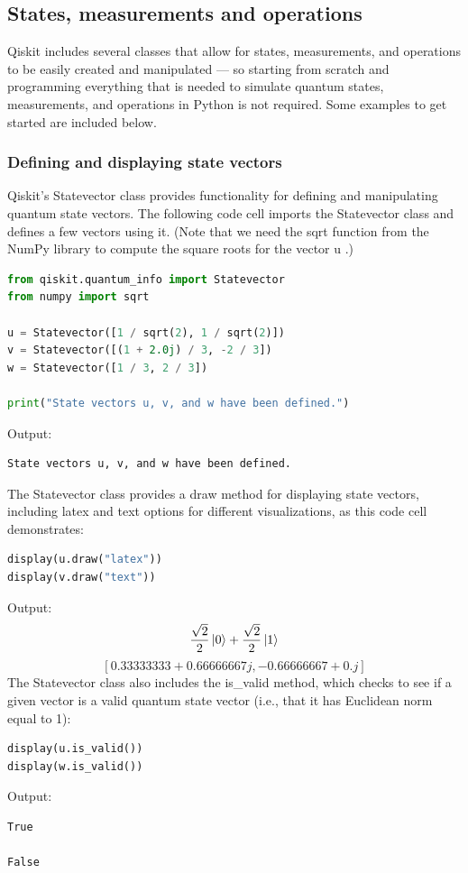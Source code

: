 \subsection{States, measurements and operations}
Qiskit includes several classes that allow for states, measurements, and operations to be easily created and manipulated — so starting from scratch and programming everything that is needed to simulate quantum states, measurements, and operations in Python is not required. Some examples to get started are included below.

\subsubsection{Defining and displaying state vectors}

Qiskit's  Statevector  class provides functionality for defining and manipulating quantum state vectors. The following code cell imports the  Statevector  class and defines a few vectors using it. (Note that we need the  sqrt  function from the  NumPy  library to compute the square roots for the vector  u .)
\begin{lstlisting}[language=Python]
from qiskit.quantum_info import Statevector
from numpy import sqrt

u = Statevector([1 / sqrt(2), 1 / sqrt(2)])
v = Statevector([(1 + 2.0j) / 3, -2 / 3])
w = Statevector([1 / 3, 2 / 3])

print("State vectors u, v, and w have been defined.")
\end{lstlisting}
Output:
\begin{lstlisting}
State vectors u, v, and w have been defined.
\end{lstlisting}

The  Statevector  class provides a  draw  method for displaying state vectors, including latex  and  text  options for different visualizations, as this code cell demonstrates:

\begin{lstlisting}[language=Python]
display(u.draw("latex"))
display(v.draw("text"))
\end{lstlisting}
Output:
\[
\frac{\sqrt{2}}{2}\ket{0}+\frac{\sqrt{2}}{2}\ket{1}
\]
\[
[ 0.33333333+0.66666667j,-0.66666667+0.j ]
\]
The  Statevector  class also includes the  is\_valid  method, which checks to see if a given vector is a valid quantum state vector (i.e., that it has Euclidean norm equal to 1):
\begin{lstlisting}[language=Python]
display(u.is_valid())
display(w.is_valid())
\end{lstlisting}
Output:
\begin{lstlisting}
True

False
\end{lstlisting}
